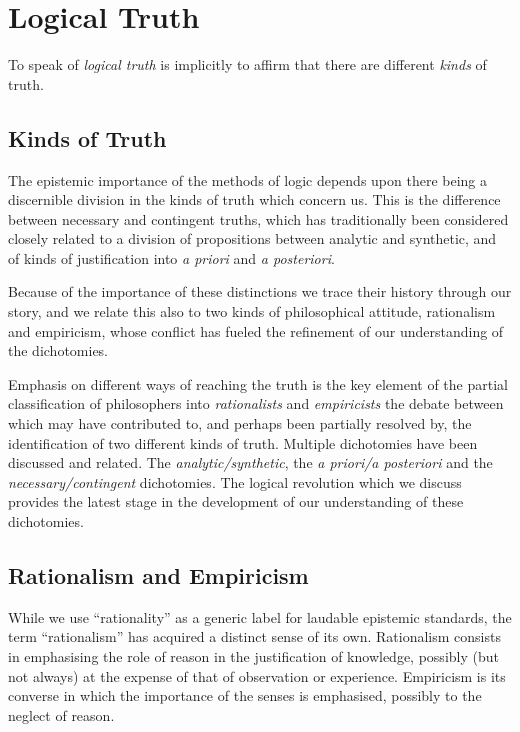 \section{Logical Truth}

To speak of {\it logical truth} is implicitly to affirm that there are different {\it kinds} of truth.

\subsection{Kinds of Truth}

The epistemic importance of the methods of logic depends upon there being a discernible division in the kinds of truth which concern us.
This is the difference between necessary and contingent truths, which has traditionally been considered closely related to a division of propositions between analytic and synthetic, and of kinds of justification into {\it a priori} and {\it a posteriori}.

Because of the importance of these distinctions we trace their history through our story, and we relate this also to two kinds of philosophical attitude, rationalism and empiricism, whose conflict has fueled the refinement of our understanding of the dichotomies.

Emphasis on different ways of reaching the truth is the key element of the partial classification of philosophers into {\it rationalists} and {\it empiricists} the debate between which may have contributed to, and perhaps been partially resolved by, the identification of two different kinds of truth.
Multiple dichotomies have been discussed and related.
The {\it analytic/synthetic}, the {\it a priori/a posteriori} and the {\it necessary/contingent} dichotomies.
The logical revolution which we discuss provides the latest stage in the development of our understanding of these dichotomies.

\subsection{Rationalism and Empiricism}


While we use ``rationality'' as a generic label for laudable epistemic standards, the term ``rationalism'' has acquired a distinct sense of its own.
Rationalism consists in emphasising the role of reason in the justification of knowledge, possibly (but not always) at the expense of that of observation or experience.
Empiricism is its converse in which the importance of the senses is emphasised, possibly to the neglect of reason.

